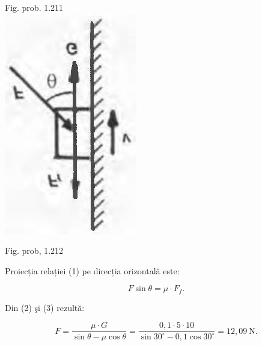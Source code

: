 \documentclass[10pt]{article}
\begin{document}
Fig. prob. 1.211\\
\includegraphics[max width=\textwidth, center]{2025_07_01_5b3ff9fa0d508c8e9f17g-244(1)}

Fig. prob, 1.212

Proiecția relației (1) pe direcția orizontală este:


\begin{equation*}
F \sin \theta=\mu \cdot F_{f} . \tag{3}
\end{equation*}


Din (2) şi (3) rezultă:

$$
F=\frac{\mu \cdot G}{\sin \theta-\mu \cos \theta}=\frac{0,1 \cdot 5 \cdot 10}{\sin 30^{\circ}-0,1 \cos 30^{\circ}}=12,09 \mathrm{~N} .
$$
\end{document}
